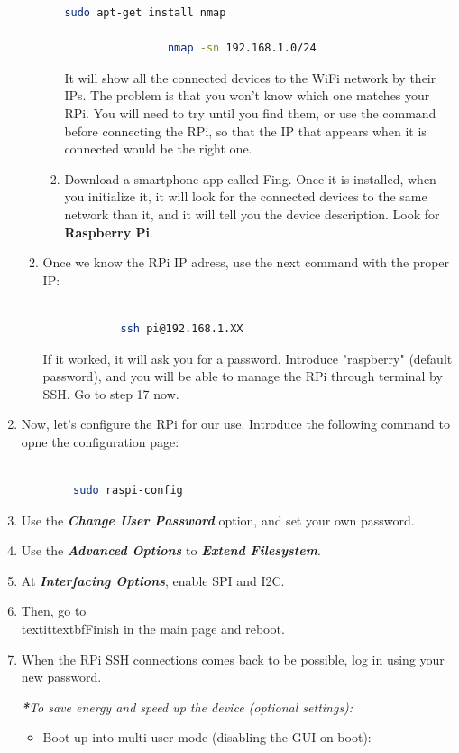 \documentclass[12pt,a4paper,oneside]{article} %
\begin{document}
\begin{enumerate}
\begin{enumerate}
\begin{enumerate}
\begin{lstlisting}[language=sh]
				sudo apt-get install nmap
				
				nmap -sn 192.168.1.0/24
			\end{lstlisting}
			It will show all the connected devices to the WiFi network by their IPs. The problem is that you won't know which one matches your RPi. You will need to try until you find them, or use the command before connecting the RPi, so that the IP that appears when it is connected would be the right one.
			\item Download a smartphone app called Fing. Once it is installed, when you initialize it, it will look for the connected devices to the same network than it, and it will tell you the device description. Look for \textbf{Raspberry Pi}.
		\end{enumerate}
		\item Once we know the RPi IP adress, use the next command with the proper IP:
		\begin{lstlisting}[language=sh]
	
			ssh pi@192.168.1.XX
		\end{lstlisting}
		
		If it worked, it will ask you for a password. Introduce "raspberry" (default password), and you will be able to manage the RPi through terminal by SSH. Go to step 17 now.
	\end{enumerate}
	\item Now, let's configure the RPi for our use. Introduce the following command to opne the configuration page:
	\begin{lstlisting}[language=sh]
	
		sudo raspi-config
	\end{lstlisting}
	\item Use the \textit{\textbf{Change User Password}} option, and set your own password.
	\item Use the \textit{\textbf{Advanced Options}} to \textit{\textbf{Extend Filesystem}}.
	\item At \textit{\textbf{Interfacing Options}}, enable SPI and I2C.
	\item Then, go to \\textit{textbf{Finish}} in the main page and reboot.
	\item  When the RPi SSH connections comes back to be possible, log in using your new password.
	
	\emph{\textbf{*}To save energy and speed up the device (optional settings):}
	\begin{itemize}
		\item Boot up into multi-user mode (disabling the GUI on boot):
		\begin{lstlisting}[language=sh]
	

\end{lstlisting}
\end{itemize}
\end{enumerate}
\end{document}
